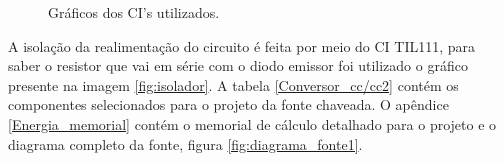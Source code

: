 \begin{figure}[H]
\centering
{}
\qquad
{}
\caption{Gráficos dos CI's utilizados.}
\end{figure}

A isolação da realimentação do circuito é feita por meio do CI TIL111, para saber o resistor que vai em série com o diodo emissor foi utilizado o gráfico presente na imagem \ref{fig:isolador}. A tabela \ref{Conversor_cc/cc2} contém os componentes selecionados para o projeto da fonte chaveada. O apêndice \ref{Energia_memorial} contém o memorial de cálculo detalhado para o projeto e o diagrama completo da fonte, figura \ref{fig:diagrama_fonte1}.

